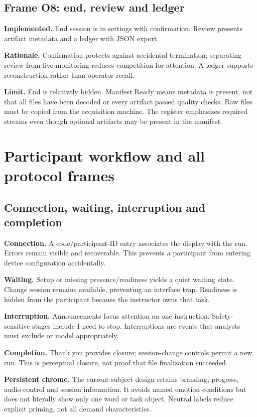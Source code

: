 \documentclass[11pt,a4paper]{article}
\begin{document}
\subsection{Frame O8: end, review and ledger}
\textbf{Implemented.} End session is in settings with confirmation. Review presents artifact metadata and a ledger with JSON export.\par
\textbf{Rationale.} Confirmation protects against accidental termination; separating review from live monitoring reduces competition for attention. A ledger supports reconstruction rather than operator recall.\par
\textbf{Limit.} End is relatively hidden. Manifest Ready means metadata is present, not that all files have been decoded or every artifact passed quality checks. Raw files must be copied from the acquisition machine. The register emphasizes required streams even though optional artifacts may be present in the manifest.

\section{Participant workflow and all protocol frames}
\subsection{Connection, waiting, interruption and completion}
\textbf{Connection.} A code/participant-ID entry associates the display with the run. Errors remain visible and recoverable. This prevents a participant from entering device configuration accidentally.\par
\textbf{Waiting.} Setup or missing presence/readiness yields a quiet waiting state. Change session remains available, preventing an interface trap. Readiness is hidden from the participant because the instructor owns that task.\par
\textbf{Interruption.} Announcements focus attention on one instruction. Safety-sensitive stages include I need to stop. Interruptions are events that analysts must exclude or model appropriately.\par
\textbf{Completion.} Thank you provides closure; session-change controls permit a new run. This is perceptual closure, not proof that file finalization succeeded.\par
\textbf{Persistent chrome.} The current subject design retains branding, progress, audio control and session information. It avoids named emotion conditions but does not literally show only one word or task object. Neutral labels reduce explicit priming, not all demand characteristics.
\end{document}
